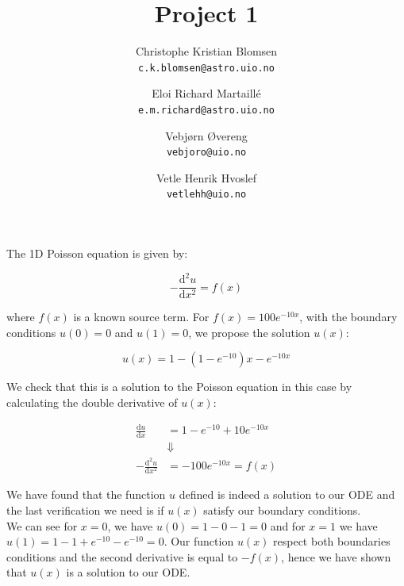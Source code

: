 \documentclass[a4paper,10pt,english]{article}
\author{Christophe Kristian Blomsen\\
    \texttt{c.k.blomsen@astro.uio.no}
    \and
    Eloi Richard Martaillé\\
    \texttt{e.m.richard@astro.uio.no}
    \and
    Vebjørn Øvereng\\
    \texttt{vebjoro@uio.no}
    \and
    Vetle Henrik Hvoslef\\
  \texttt{vetlehh@uio.no}}
\title{Project 1}
\newcommand{\dd}[1]{\mathrm{d}#1}
\begin{document}
\begin{titlepage}
  \maketitle
  \tableofcontents

\end{titlepage}

%



\section{} %

The 1D Poisson equation is given by:

\begin{equation}
  -\frac{\dd{^2u}}{\dd{x^2}} = f(x)
\end{equation}

where $f(x)$ is a known source term.
For $f(x) = 100e^{-10x}$, with the boundary conditions $u(0) = 0$ and $u(1) = 0$, we propose the solution $u(x)$:

\begin{equation}
    u(x) = 1 - (1 - e^{-10})x - e^{-10x}
\end{equation}

We check that this is a solution to the Poisson equation in this case by calculating the double derivative of $u(x)$:

\begin{align*}
  \frac{\dd{u}}{\dd{x}} &= 1 - e^{-10} +10 e^{-10x} \\
  &\Downarrow\\
     -\frac{\dd{^2u}}{\dd{x}^2} &= -100e^{-10x} = f(x)
\end{align*}

We have found that the function $u$ defined is indeed a solution to our ODE and
the last verification we need is if $u(x)$ satisfy our boundary conditions. \\

We can see for $x=0$, we have $u(0)= 1 - 0 -1 =0$ and for $x=1$ we have
$u(1) = 1 - 1 + e^{-10} - e^{-10} = 0$. Our function $u(x)$ respect both
boundaries conditions and the second derivative is equal to $-f(x)$, hence we
have shown that $u(x)$ is a solution to our ODE.

\section{} %
\end{document}

